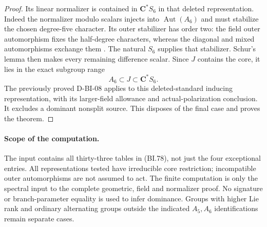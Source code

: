 \begin{proof}
Its linear normalizer is contained in $\mathbf C^*S_6$ in that
deleted representation.  Indeed the normalizer modulo scalars
injects into $\operatorname{Aut}(A_6)$ and must stabilize the
chosen degree-five character.  Its outer stabilizer has order two:
the field outer automorphism fixes the half-degree characters,
whereas the diagonal and mixed automorphisms exchange them
\cite[Lemmas~4.4 and~4.6, pp.~9--10]{BI:WhiteSL2}.
The natural $S_6$ supplies that stabilizer.  Schur's lemma then
makes every remaining difference scalar.  Since $J$ contains
the core, it lies in the exact subgroup range
\[
                          A_6\subset J\subset\mathbf C^*S_6.
\]
The previously proved D-BI-08 applies to this deleted-standard
inducing representation, with its larger-field allowance and
actual-polarization conclusion.  It excludes a dominant nonsplit
source.  This disposes of the final case and proves the theorem.
\end{proof}

\paragraph{Scope of the computation.}
The input contains all thirty-three tables in (BI.78), not just
the four exceptional entries.  All representations tested have
irreducible core restriction; incompatible outer automorphisms
are not assumed to act.  The finite computation is only the
spectral input to the complete geometric, field and normalizer
proof.  No signature or branch-parameter equality is used to
infer dominance.  Groups with higher Lie rank and ordinary
alternating groups outside the indicated $A_5,A_6$ identifications
remain separate cases.
